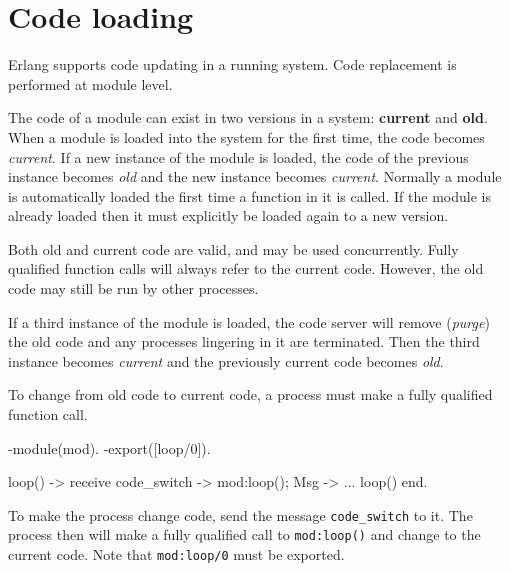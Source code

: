 \chapter{Code loading}
\label{code}

Erlang supports code updating in a running system. Code replacement is
performed at module level.

The code of a module can exist in two versions in a system:
\textbf{current} and \textbf{old}. When a module is
loaded into the system for the first time, the code becomes
\textit{current}. If a new instance of the module is loaded, the code
of the previous instance becomes \textit{old} and the new instance
becomes \textit{current}. Normally a module is automatically loaded
the first time a function in it is called. If the module is already
loaded then it must explicitly be loaded again to a new version.

Both old and current code are valid, and may be used
concurrently. Fully qualified function calls will always refer to the
current code. However, the old code may still be run by other
processes.

If a third instance of the module is loaded, the code server will
remove (\textit{purge}) the old code and any processes lingering in it
are terminated. Then the third instance becomes \textit{current} and
the previously current code becomes \textit{old}.

To change from old code to current code, a process must make a fully
qualified function call.

\begin{erlang}
-module(mod).
-export([loop/0]).

loop() ->
    receive
        code_switch ->
            mod:loop();
        Msg ->
            ...
            loop()
    end.
\end{erlang}

To make the process change code, send the message
\texttt{code\_switch} to it. The process then will make a fully
qualified call to \texttt{mod:loop()} and change to the current
code. Note that \texttt{mod:loop/0} must be exported.